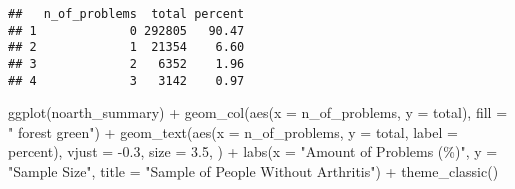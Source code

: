 \documentclass[
]{article}
\newenvironment{Shaded}{\begin{snugshade}}{\end{snugshade}}
\newcommand{\AttributeTok}[1]{\textcolor[rgb]{0.77,0.63,0.00}{#1}}
\newcommand{\DecValTok}[1]{\textcolor[rgb]{0.00,0.00,0.81}{#1}}
\newcommand{\FloatTok}[1]{\textcolor[rgb]{0.00,0.00,0.81}{#1}}
\newcommand{\FunctionTok}[1]{\textcolor[rgb]{0.00,0.00,0.00}{#1}}
\newcommand{\NormalTok}[1]{#1}
\newcommand{\OtherTok}[1]{\textcolor[rgb]{0.56,0.35,0.01}{#1}}
\newcommand{\SpecialCharTok}[1]{\textcolor[rgb]{0.00,0.00,0.00}{#1}}
\newcommand{\StringTok}[1]{\textcolor[rgb]{0.31,0.60,0.02}{#1}}
\begin{document}
\begin{Shaded}
\end{Shaded}

\begin{verbatim}
##   n_of_problems  total percent
## 1             0 292805   90.47
## 2             1  21354    6.60
## 3             2   6352    1.96
## 4             3   3142    0.97
\end{verbatim}

\begin{Shaded}
\begin{Highlighting}[]
\FunctionTok{ggplot}\NormalTok{(noarth\_summary) }\SpecialCharTok{+}
  \FunctionTok{geom\_col}\NormalTok{(}\FunctionTok{aes}\NormalTok{(}\AttributeTok{x =}\NormalTok{ n\_of\_problems, }\AttributeTok{y =}\NormalTok{ total), }\AttributeTok{fill =} \StringTok{" forest green"}\NormalTok{) }\SpecialCharTok{+}
  \FunctionTok{geom\_text}\NormalTok{(}\FunctionTok{aes}\NormalTok{(}\AttributeTok{x =}\NormalTok{ n\_of\_problems, }\AttributeTok{y =}\NormalTok{ total, }\AttributeTok{label =}\NormalTok{ percent), }\AttributeTok{vjust =} \SpecialCharTok{{-}}\FloatTok{0.3}\NormalTok{, }\AttributeTok{size =} \FloatTok{3.5}\NormalTok{, ) }\SpecialCharTok{+}
  \FunctionTok{labs}\NormalTok{(}\AttributeTok{x =} \StringTok{"Amount of Problems (\%)"}\NormalTok{,}
       \AttributeTok{y =} \StringTok{"Sample Size"}\NormalTok{,}
       \AttributeTok{title =} \StringTok{"Sample of People Without Arthritis"}\NormalTok{) }\SpecialCharTok{+}
  \FunctionTok{theme\_classic}\NormalTok{()}
\end{Highlighting}
\end{Shaded}
\end{document}
